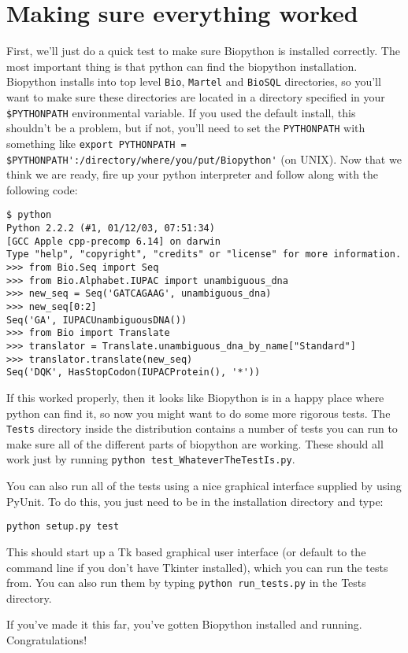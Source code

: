 \documentclass{article}
\begin{document}
\section{Making sure everything worked}
\label{sec:is_working}

First, we'll just do a quick test to make sure Biopython is installed correctly. The most important thing is that python can find the biopython installation. Biopython installs into top level \verb|Bio|, \verb|Martel| and \verb|BioSQL| directories, so you'll want to make sure these directories are located in a directory specified 
in your\verb| $PYTHONPATH| environmental variable. If you used the default install, this shouldn't be a problem, but if not, you'll need to set the \verb|PYTHONPATH| with something like \verb|export PYTHONPATH = $PYTHONPATH':/directory/where/you/put/Biopython'| (on UNIX). Now that we think we are ready, fire up your python interpreter and follow along with the following code:

\begin{verbatim}
$ python
Python 2.2.2 (#1, 01/12/03, 07:51:34) 
[GCC Apple cpp-precomp 6.14] on darwin
Type "help", "copyright", "credits" or "license" for more information.
>>> from Bio.Seq import Seq
>>> from Bio.Alphabet.IUPAC import unambiguous_dna
>>> new_seq = Seq('GATCAGAAG', unambiguous_dna)
>>> new_seq[0:2]
Seq('GA', IUPACUnambiguousDNA())
>>> from Bio import Translate
>>> translator = Translate.unambiguous_dna_by_name["Standard"]
>>> translator.translate(new_seq)
Seq('DQK', HasStopCodon(IUPACProtein(), '*'))
\end{verbatim}

If this worked properly, then it looks like Biopython is in a happy place where python can find it, so now you might want to do some more rigorous tests. The \verb|Tests| directory inside the distribution contains a number of tests you can run to make sure all of the different parts of biopython are working. These should all work just by running \verb|python test_WhateverTheTestIs.py|. 


You can also run all of the tests using a nice graphical interface supplied by using PyUnit. To do this, you just need to be in the installation directory and type:

\begin{verbatim}
python setup.py test
\end{verbatim}

This should start up a Tk based graphical user interface (or default to the command line if you don't have Tkinter installed), which you can run the tests from. You can also run them by typing \verb|python run_tests.py| in the Tests directory.


If you've made it this far, you've gotten Biopython installed and running.
Congratulations!
\end{document}
